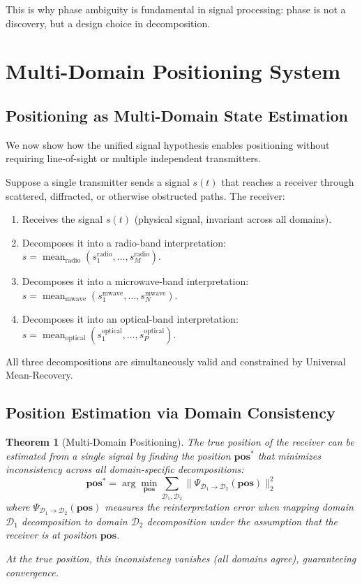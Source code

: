 \documentclass[twocolumn,11pt,a4paper]{article}
\newtheorem{theorem}{Theorem}[section]
\newcommand{\signal}{s}
\newcommand{\domain}{\mathcal{D}}
\newcommand{\mean}{\operatorname{mean}}
\begin{document}
This is why phase ambiguity is fundamental in signal processing: phase is not a discovery, but a design choice in decomposition.

\section{Multi-Domain Positioning System}
\label{sec:positioning}

\subsection{Positioning as Multi-Domain State Estimation}

We now show how the unified signal hypothesis enables positioning without requiring line-of-sight or multiple independent transmitters.

\begin{setup}
Suppose a single transmitter sends a signal $\signal(t)$ that reaches a receiver through scattered, diffracted, or otherwise obstructed paths. The receiver:
\begin{enumerate}[nosep]
  \item Receives the signal $\signal(t)$ (physical signal, invariant across all domains).
  \item Decomposes it into a radio-band interpretation: $\signal = \mean_{\text{radio}}(\signal_1^{\text{radio}}, \ldots, \signal_M^{\text{radio}})$.
  \item Decomposes it into a microwave-band interpretation: $\signal = \mean_{\text{mwave}}(\signal_1^{\text{mwave}}, \ldots, \signal_N^{\text{mwave}})$.
  \item Decomposes it into an optical-band interpretation: $\signal = \mean_{\text{optical}}(\signal_1^{\text{optical}}, \ldots, \signal_P^{\text{optical}})$.
\end{enumerate}
All three decompositions are simultaneously valid and constrained by Universal Mean-Recovery.
\end{setup}

\subsection{Position Estimation via Domain Consistency}

\begin{theorem}[Multi-Domain Positioning]
The true position of the receiver can be estimated from a single signal by finding the position $\mathbf{pos}^*$ that minimizes inconsistency across all domain-specific decompositions:
\begin{equation}
  \mathbf{pos}^* = \arg\min_{\mathbf{pos}} \sum_{\domain_1, \domain_2} \| \Psi_{\domain_1 \to \domain_2}(\mathbf{pos}) \|_2^2
\end{equation}
where $\Psi_{\domain_1 \to \domain_2}(\mathbf{pos})$ measures the reinterpretation error when mapping domain $\domain_1$ decomposition to domain $\domain_2$ decomposition under the assumption that the receiver is at position $\mathbf{pos}$.

At the true position, this inconsistency vanishes (all domains agree), guaranteeing convergence.
\end{theorem}
\end{document}
